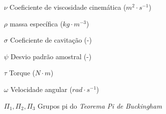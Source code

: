 \begin{simbolos}
  \item[$\nu$] Coeficiente de viscosidade cinemática ($m^2\cdot s^{-1}$)
  \item[$\rho$] massa específica ($kg\cdot m^{-3}$)
  \item[$\sigma$] Coeficiente de cavitação (-)
  \item[$\psi$] Desvio padrão amostral (-)
  \item[$\tau$] Torque ($N\cdot m$)
  \item[$\omega$] Velocidade angular ($rad\cdot s^{-1}$)
  \item[$\Pi_1, \Pi_2, \Pi_3$] Grupos pi do \textit{Teorema Pi de Buckingham}
  
  
  
\end{simbolos}
